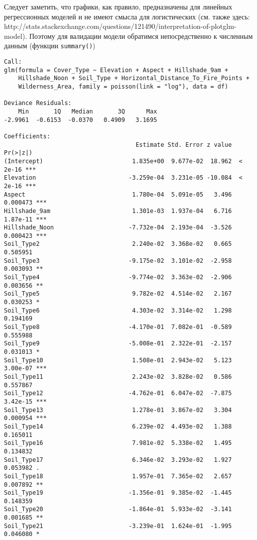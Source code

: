 \documentclass[12pt]{article}
\begin{document}
Следует заметить, что графики, как правило, предназначены для линейных регрессионных моделей и не имеют смысла для логистических
(см. также здесь:\\ http://stats.stackexchange.com/questions/121490/interpretation-of-plotglm-model).
Поэтому для валидации модели обратимся непосредственно к численным данным (функции \verb|summary()|)
\begin{verbatim}
Call:
glm(formula = Cover_Type ~ Elevation + Aspect + Hillshade_9am +
    Hillshade_Noon + Soil_Type + Horizontal_Distance_To_Fire_Points +
    Wilderness_Area, family = poisson(link = "log"), data = df)

Deviance Residuals:
    Min       1Q   Median       3Q      Max
-2.9961  -0.6153  -0.0370   0.4909   3.1695

Coefficients:
                                     Estimate Std. Error z value Pr(>|z|)
(Intercept)                         1.835e+00  9.677e-02  18.962  < 2e-16 ***
Elevation                          -3.259e-04  3.231e-05 -10.084  < 2e-16 ***
Aspect                              1.780e-04  5.091e-05   3.496 0.000473 ***
Hillshade_9am                       1.301e-03  1.937e-04   6.716 1.87e-11 ***
Hillshade_Noon                     -7.732e-04  2.193e-04  -3.526 0.000423 ***
Soil_Type2                          2.240e-02  3.368e-02   0.665 0.505951
Soil_Type3                         -9.175e-02  3.101e-02  -2.958 0.003093 **
Soil_Type4                         -9.774e-02  3.363e-02  -2.906 0.003656 **
Soil_Type5                          9.782e-02  4.514e-02   2.167 0.030253 *
Soil_Type6                          4.303e-02  3.314e-02   1.298 0.194169
Soil_Type8                         -4.170e-01  7.082e-01  -0.589 0.555988
Soil_Type9                         -5.008e-01  2.322e-01  -2.157 0.031013 *
Soil_Type10                         1.508e-01  2.943e-02   5.123 3.00e-07 ***
Soil_Type11                         2.243e-02  3.828e-02   0.586 0.557867
Soil_Type12                        -4.762e-01  6.047e-02  -7.875 3.42e-15 ***
Soil_Type13                         1.278e-01  3.867e-02   3.304 0.000954 ***
Soil_Type14                         6.239e-02  4.493e-02   1.388 0.165011
Soil_Type16                         7.981e-02  5.338e-02   1.495 0.134832
Soil_Type17                         6.346e-02  3.293e-02   1.927 0.053982 .
Soil_Type18                         1.957e-01  7.365e-02   2.657 0.007892 **
Soil_Type19                        -1.356e-01  9.385e-02  -1.445 0.148359
Soil_Type20                        -1.864e-01  5.933e-02  -3.141 0.001685 **
Soil_Type21                        -3.239e-01  1.624e-01  -1.995 0.046080 *

\end{verbatim}
\end{document}

